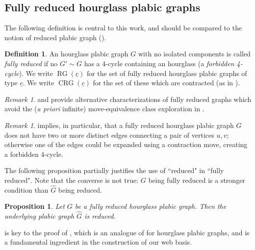 \documentclass{amsart}
\newtheorem{proposition}[theorem]{Proposition}
\theoremstyle{definition}
\newtheorem{definition}[theorem]{Definition}
\theoremstyle{remark}
\newtheorem{remark}[theorem]{Remark}
\numberwithin{equation}{section}
\DeclareMathOperator{\crg}{CRG}
\DeclareMathOperator{\rg}{RG}
\begin{document}
\subsection{Fully reduced hourglass plabic graphs}

The following definition is central to this work, and should be compared to the notion of reduced plabic graph ().

\begin{definition}
\label{def:fully-reduced}
An hourglass plabic graph $G$ with no isolated components is called \emph{fully reduced} if no $G' \sim G$ has a 4-cycle containing an hourglass (a \emph{forbidden 4-cycle}). We write $\rg(\underline{c})$ for the set of fully reduced hourglass plabic graphs of type $\underline{c}$. We write $\crg(\underline{c})$ for the set of these which are contracted (as in ).
\end{definition}

\begin{remark}
 and  provide alternative characterizations of fully reduced graphs which avoid the (\emph{a priori} infinite) move-equivalence class exploration in .
\end{remark}

\begin{remark}
 implies, in particular, that a fully reduced hourglass plabic graph $G$ does not have two or more distinct edges connecting a pair of vertices $u,v$; otherwise one of the edges could be expanded using a contraction move, creating a forbidden 4-cycle.
\end{remark}

The following proposition partially justifies the use of ``reduced" in ``fully reduced". Note that the converse  is not true: $G$ being fully reduced is a stronger condition than $\widehat{G}$ being reduced.

\begin{proposition}
\label{prop:underlying-plabic-is-reduced}
Let $G$ be a fully reduced hourglass plabic graph. Then the underlying plabic graph $\widehat{G}$ is reduced.
\end{proposition}

 is key to the proof of
, which is an analogue of  for hourglass plabic graphs, and is a fundamental ingredient in the construction of our web basis.
\end{document}
